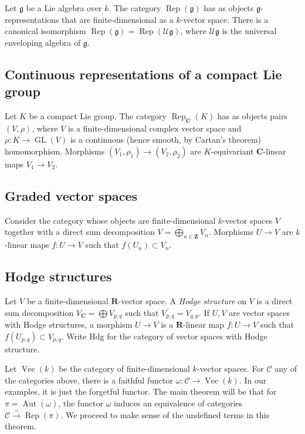 \documentclass{article}
\DeclareMathOperator{\aut}{Aut}
\DeclareMathOperator{\GL}{GL}
\DeclareMathOperator{\rep}{Rep}
\DeclareMathOperator{\vect}{Vec}
\newcommand{\cC}{\mathcal{C}}
\newcommand{\cU}{\mathcal{U}}
\newcommand{\dC}{\mathbf{C}}
\newcommand{\dR}{\mathbf{R}}
\newcommand{\dZ}{\mathbf{Z}}
\newcommand{\fg}{\mathfrak{g}}
\newcommand{\hodge}{\mathrm{Hdg}}
\newcommand{\iso}{\xrightarrow\sim}
\begin{document}
Let $\fg$ be a Lie algebra over $k$. The category $\rep(\fg)$ has as objects 
$\fg$-representations that are finite-dimensional as a $k$-vector space. There 
is a canonical isomorphism $\rep(\fg)=\rep(\cU \fg)$, where $\cU \fg$ is the 
universal enveloping algebra of $\fg$. 


\subsection{Continuous representations of a compact Lie group}\label{sec:rep-cpct}

Let $K$ be a compact Lie group. The category $\rep_\dC(K)$ has as objects 
pairs $(V,\rho)$, where $V$ is a finite-dimensional complex vector space and 
$\rho:K\to \GL(V)$ is a continuous (hence smooth, by Cartan's theorem) 
homomorphism. Morphisms $(V_1,\rho_1)\to (V_2,\rho_2)$ are $K$-equivariant 
$\dC$-linear maps $V_1\to V_2$. 


\subsection{Graded vector spaces}

Consider the category whose objects are finite-dimensional $k$-vector spaces 
$V$ together with a direct sum decomposition $V=\bigoplus_{n\in \dZ} V_n$. 
Morphisms $U\to V$ are $k$-linear maps $f:U\to V$ such that 
$f(U_n)\subset V_n$. 


\subsection{Hodge structures}

Let $V$ be a finite-dimensional $\dR$-vector space. A \emph{Hodge structure} 
on $V$ is a direct sum decomposition $V_\dC=\bigoplus V_{p,q}$ such that 
$\overline{V_{p,q}}=V_{q,p}$. If $U,V$ are vector spaces with Hodge structures, 
a morphism $U\to V$ is a $\dR$-linear map $f:U\to V$ such that 
$f(U_{p,q})\subset V_{p,q}$. Write $\hodge$ for the category of vector spaces 
with Hodge structure. 

Let $\vect(k)$ be the category of finite-dimensional $k$-vector spaces. For 
$\cC$ any of the categories above, there is a faithful functor 
$\omega:\cC\to \vect(k)$. In our examples, it is just the forgetful functor. 
The main theorem will be that for $\pi=\aut(\omega)$, the functor $\omega$ 
induces an equivalence of categories $\cC\iso \rep(\pi)$. We proceed to make 
sense of the undefined terms in this theorem. 
\end{document}
